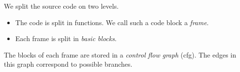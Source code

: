 We split the source code on two levels.
\begin{itemize}
\item The code is split in functions. We call such a code block a \emph{frame}.
\item Each frame is split in \emph{basic blocks}.
\end{itemize}

The blocks of each frame are stored in a \emph{control flow graph} (cfg). The edges in this graph correspond to possible branches.

